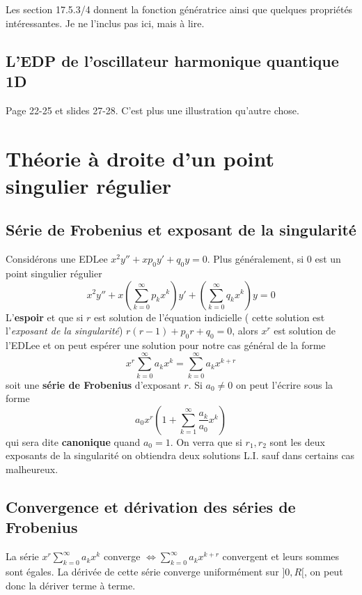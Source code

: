 	Les section 17.5.3/4 donnent la fonction génératrice ainsi que quelques 
	propriétés intéressantes. Je ne l'inclus pas ici, mais à lire.
	
	\setcounter{subsection}{6}
	\subsection{L'EDP de l'oscillateur harmonique quantique 1D}
	Page 22-25 et slides 27-28. C'est plus une illustration qu'autre chose.
	
	
\setcounter{section}{6}
\section{Théorie à droite d'un point singulier régulier}
	\subsection{Série de Frobenius et exposant de la singularité}
	Considérons une EDLee $x^2y''+xp_0y'+q_0y=0$. Plus généralement, si
	0 est un point singulier régulier 
	\begin{equation}
	x^2y''+x\left(\sum_{k=0}^\infty p_kx^k\right)y'+\left(\sum_{k=0}^\infty 
	q_kx^k\right)y=0
	\end{equation}
	L'\textbf{espoir} et que si $r$ est solution de l'équation indicielle (
	cette solution est l'\textit{exposant de la singularité})
	$r(r-1)+p_0r+q_0=0$, alors $x^r$ est solution de l'EDLee et on peut espérer 
	une solution pour notre cas général de la forme
	\begin{equation}
	x^r\sum_{k=0}^\infty a_kx^{k} = \sum_{k=0}^\infty a_kx^{k+r}
	\end{equation}
	soit une \textbf{série de Frobenius} d'exposant $r$. Si $a_0\neq0$ on peut 
	l'écrire sous la forme
	\begin{equation}
	a_0x^r\left(1+\sum_{k=1}^\infty \frac{a_k}{a_0}x^k\right)
	\end{equation}
	qui sera dite \textbf{canonique} quand $a_0=1$. On verra que si $r_1,r_2$ sont 
	les deux exposants de la singularité on obtiendra deux solutions L.I. sauf 
	dans certains cas malheureux.
	
	\subsection{Convergence et dérivation des séries de Frobenius}
	La série $x^r\sum_{k=0}^\infty a_kx^{k}$ converge $\Leftrightarrow\sum_{k=0}^\infty 
	a_kx^{k+r}$ convergent et leurs sommes sont égales. La dérivée de cette série 
	converge uniformément sur $]0,R[$, on peut donc la dériver terme à terme.
	
